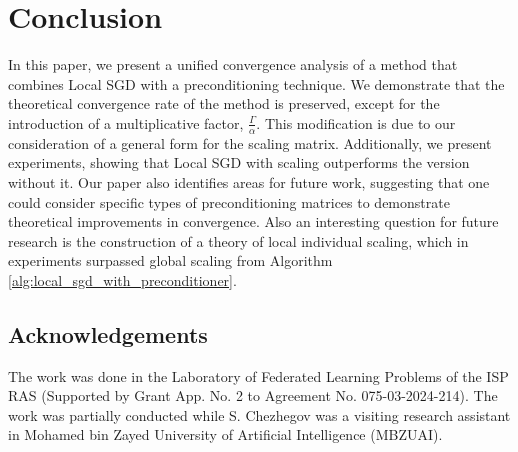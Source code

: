 \documentclass[sn-mathphys,Numbered]{sn-jnl}%
\renewcommand{\|}{\parallel}
\renewcommand {\*} {\ast}
\begin{document}
\section{Conclusion}

In this paper, we present a unified convergence analysis of a method that combines Local SGD with a preconditioning technique. We demonstrate that the theoretical convergence rate of the method is preserved, except for the introduction of a multiplicative factor, $\frac{\Gamma}{\alpha}$. 
This modification is due to our consideration of a general form for the scaling matrix. 
Additionally, we present experiments, showing that Local SGD with scaling outperforms the version without it. 
Our paper also identifies areas for future work, suggesting that one could consider specific types of preconditioning matrices to demonstrate theoretical improvements in convergence. Also an interesting question for future research is the construction of a theory of local individual scaling, which in experiments surpassed global scaling from Algorithm \ref{alg:local_sgd_with_preconditioner}.

\subsection*{Acknowledgements}

The work was done in the Laboratory of Federated Learning Problems of the ISP RAS (Supported by Grant App. No. 2 to Agreement No. 075-03-2024-214).
The work was partially conducted while S. Chezhegov was a visiting research assistant in Mohamed bin Zayed University of Artificial Intelligence (MBZUAI).
 


\clearpage
\appendix
\end{document}

